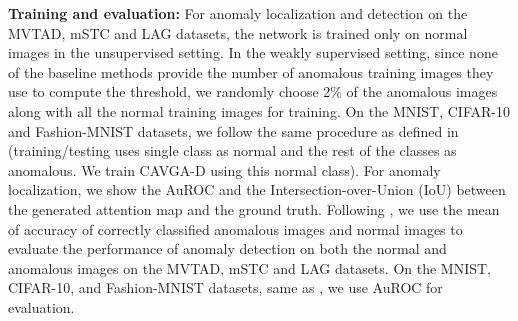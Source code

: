 \documentclass[runningheads]{llncs}
\begin{document}
\textbf{Training and evaluation:} For anomaly localization and detection on the MVTAD, mSTC and LAG datasets, the network is trained only on normal images in the unsupervised setting. In the weakly supervised setting, since none of the baseline methods provide the number of anomalous training images they use to compute the threshold, we randomly choose 2\% of the anomalous images along with all the normal training images for training. On the MNIST, CIFAR-10 and Fashion-MNIST datasets, we follow the same procedure as defined in \cite{deecke2018image} (training/testing uses single class as normal and the rest of the classes as anomalous. We train CAVGA-D using this normal class).
For anomaly localization, we show the AuROC \cite{bergmann2019mvtec} and the Intersection-over-Union (IoU) between the generated attention map and the ground truth. Following \cite{bergmann2019mvtec}, we use the mean of accuracy of correctly classified anomalous images and normal images to evaluate the performance of anomaly detection on both the normal and anomalous images on the MVTAD, mSTC and LAG datasets. On the MNIST, CIFAR-10, and Fashion-MNIST datasets, same as \cite{deecke2018image}, we use AuROC for evaluation.
\end{document}
